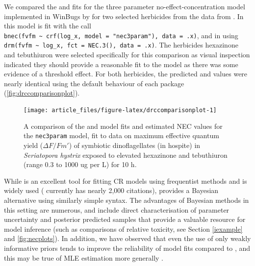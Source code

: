 \documentclass[
  shortnames]{jss}
\begin{document}
We compared the  and  fits for the three parameter no-effect-concentration model implemented in WinBugs by \citet{Fox2010} for two selected herbicides from the data from \citet{jones2003meps}. In  this model is fit with the call \texttt{bnec(fvfm\ \textasciitilde{}\ crf(log\_x,\ model\ =\ "nec3param"),\ data\ =\ .x)}, and in  using \texttt{drm(fvfm\ \textasciitilde{}\ log\_x,\ fct\ =\ NEC.3(),\ data\ =\ .x)}. The herbicides hexazinone and tebuthiuron were selected specifically for this comparison as visual inspection indicated they should provide a reasonable fit to the \citep{Fox2010} model as there was some evidence of a threshold effect. For both herbicides, the predicted  and  values were nearly identical using the default behaviour of each package (\autoref{fig:drccomparisonplot}).

\begin{CodeChunk}
\begin{figure}[!ht]

{\centering \texttt{[image: article\_files/figure-latex/drccomparisonplot-1]} 

}

\caption[A comparison of the  and  model fits and estimated NEC values for the \texttt{nec3param} model, fit to data on maximum effective quantum yield ($\Delta F / Fm'$) of symbiotic dinoflagellates (in hospite) in \textit{Seriatopora hystrix} exposed to elevated hexazinone and tebuthiuron (range 0.3 to 1000 ug per L) for 10 h]{A comparison of the  and  model fits and estimated NEC values for the \texttt{nec3param} model, fit to data on maximum effective quantum yield ($\Delta F / Fm'$) of symbiotic dinoflagellates (in hospite) in \textit{Seriatopora hystrix} exposed to elevated hexazinone and tebuthiuron (range 0.3 to 1000 ug per L) for 10 h.}\label{fig:drccomparisonplot}
\end{figure}
\end{CodeChunk}

While  is an excellent tool for fitting CR models using frequentist methods and is widely used (\citet{Ritz2016} currently has nearly 2,000 citations),  provides a Bayesian alternative using similarly simple syntax. The advantages of Bayesian methods in this setting are numerous, and include direct characterisation of parameter uncertainty and posterior predicted samples that provide a valuable resource for model inference (such as comparisons of relative toxicity, see Section \ref{iexample} and \autoref{fig:necplots}). In addition, we have observed that even the use of only weakly informative priors tends to improve the reliability of model fits compared to , and this may be true of MLE estimation more generally \citep{krull2020comparing}.
\end{document}
